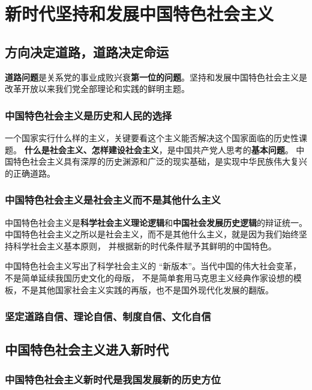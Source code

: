 \documentclass[UTF8,10pt]{ctexbook} %
\begin{document}
\chapter{新时代坚持和发展中国特色社会主义}

\section{方向决定道路，道路决定命运}

\textbf{道路问题}是关系党的事业成败兴衰\textbf{第一位的问题}。坚持和发展中国特色社会主义是改革开放以来我们党全部理论和实践的鲜明主题。

\subsection{中国特色社会主义是历史和人民的选择}

一个国家实行什么样的主义，关键要看这个主义能否解决这个国家面临的历史性课题。
\textbf{什么是社会主义、怎样建设社会主义}，是中国共产党人思考的\textbf{基本问题}。
中国特色社会主义具有深厚的历史渊源和广泛的现实基础，是实现中华民族伟大复兴的正确道路。

\subsection{中国特色社会主义是社会主义而不是其他什么主义}

中国特色社会主义是\textbf{科学社会主义理论逻辑}和\textbf{中国社会发展历史逻辑}的辩证统一。
中国特色社会主义之所以是社会主义，而不是其他什么主义，就是因为我们始终坚持科学社会主义基本原则，
并根据新的时代条件赋予其鲜明的中国特色。

中国特色社会主义写出了科学社会主义的 “新版本”。当代中国的伟大社会变革，不是简单延续我国历史文化的母版，
不是简单套用马克思主义经典作家设想的模板，不是其他国家社会主义实践的再版，也不是国外现代化发展的翻版。

\subsection{坚定道路自信、理论自信、制度自信、文化自信}



\section{中国特色社会主义进入新时代}

\subsection{中国特色社会主义新时代是我国发展新的历史方位}
\end{document}
